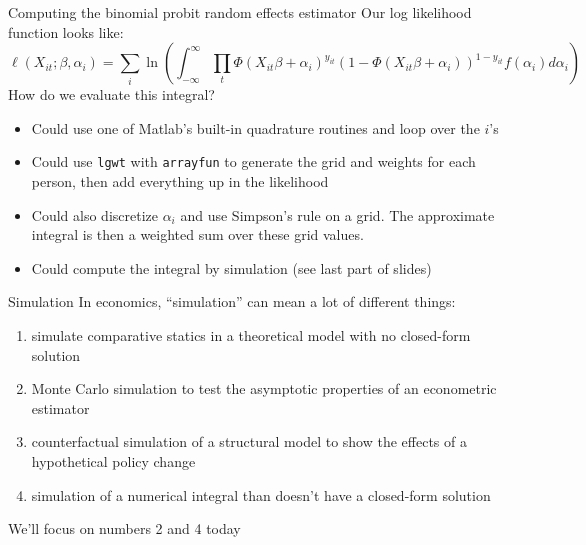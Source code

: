 \documentclass[english,xcolor=dvipsnames]{beamer}
\begin{document}
\begin{frame}{Computing the binomial probit random effects estimator}
Our log likelihood function looks like:
\begin{equation*}
\ell(X_{it};\beta,\alpha_{i})=\sum_{i}\ln\left(\int_{-\infty}^{\infty}\prod_{t}\Phi\left(X_{it}\beta+\alpha_{i}\right)^{y_{it}}\left(1-\Phi\left(X_{it}\beta+\alpha_{i}\right)\right)^{1-y_{it}}f\left(\alpha_{i}\right)d\alpha_{i}\right)
\end{equation*}
How do we evaluate this integral?
\begin{itemize}
	\item Could use one of Matlab's built-in quadrature routines and loop over the $i$'s
	\item Could use \texttt{lgwt} with \texttt{arrayfun} to generate the grid and weights for each person, then add everything up in the likelihood
	\item Could also discretize $\alpha_{i}$ and use Simpson's rule on a grid. The approximate integral is then a weighted sum over these grid values.
	\item Could compute the integral by simulation (see last part of slides)
\end{itemize}
\end{frame}

\begin{frame}{Simulation}
In economics, ``simulation'' can mean a lot of different things:
\begin{enumerate}
	\item simulate comparative statics in a theoretical model with no closed-form solution
	\item Monte Carlo simulation to test the asymptotic properties of an econometric estimator
	\item counterfactual simulation of a structural model to show the effects of a hypothetical policy change
	\item simulation of a numerical integral than doesn't have a closed-form solution
\end{enumerate}
We'll focus on numbers 2 and 4 today
\end{frame}
\end{document}
